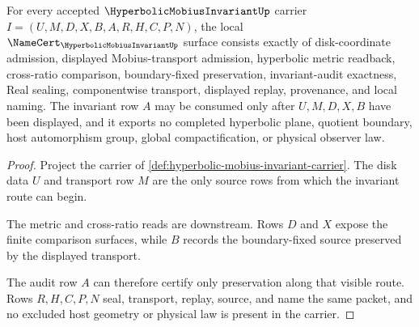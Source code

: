 \begin{theorem}
\label{thm:hyperbolic-mobius-invariant-namecert-obligations}
For every accepted $\HyperbolicMobiusInvariantUp$ carrier $I=(U,M,D,X,B,A,R,H,C,P,N)$, the local $\NameCert_{\HyperbolicMobiusInvariantUp}$ surface consists exactly of disk-coordinate admission, displayed Mobius-transport admission, hyperbolic metric readback, cross-ratio comparison, boundary-fixed preservation, invariant-audit exactness, Real sealing, componentwise transport, displayed replay, provenance, and local naming. The invariant row $A$ may be consumed only after $U,M,D,X,B$ have been displayed, and it exports no completed hyperbolic plane, quotient boundary, host automorphism group, global compactification, or physical observer law.
\end{theorem}
\begin{proof}
Project the carrier of \autoref{def:hyperbolic-mobius-invariant-carrier}. The disk data $U$ and transport row $M$ are the only source rows from which the invariant route can begin.

The metric and cross-ratio reads are downstream. Rows $D$ and $X$ expose the finite comparison surfaces, while $B$ records the boundary-fixed source preserved by the displayed transport.

The audit row $A$ can therefore certify only preservation along that visible route. Rows $R,H,C,P,N$ seal, transport, replay, source, and name the same packet, and no excluded host geometry or physical law is present in the carrier.
\end{proof}



